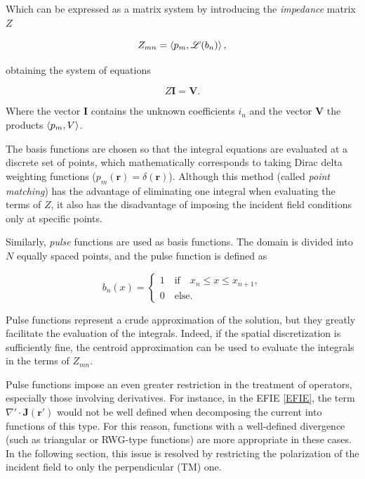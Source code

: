 \documentclass[11pt,a4paper,twoside,pdf]{article}
\numberwithin{equation}{section}
\begin{document}
Which can be expressed as a matrix system by introducing the \textit{impedance} matrix $Z$

$$
    Z_{mn} = \braket{p_m, \mathscr{L}(b_n)},
$$

obtaining the system of equations

\begin{equation}
    Z \mathbf{I} = \mathbf{V}.
\label{ZIV}
\end{equation}

Where the vector $\mathbf{I}$ contains the unknown coefficients $i_n$ and the vector $\mathbf{V}$ the products $\braket{p_m, V}$.

The basis functions are chosen so that the integral equations are evaluated at a discrete set of points, which mathematically corresponds to taking Dirac delta weighting functions ($p_m(\mathbf{r}) = \delta(\mathbf{r})$). Although this method (called \textit{point matching}) has the advantage of eliminating one integral when evaluating the terms of $Z$, it also has the disadvantage of imposing the incident field conditions only at specific points.


Similarly, \textit{pulse} functions are used as basis functions. The domain is divided into $N$ equally spaced points, and the pulse function is defined as

$$
    b_n(x) =
    \begin{cases}
        1 \quad \text{if}  \quad x_n \leq x \leq x_{n+1}, \\
        0  \quad  \text{else}.
    \end{cases}
$$

Pulse functions represent a crude approximation of the solution, but they greatly facilitate the evaluation of the integrals. Indeed, if the spatial discretization is sufficiently fine, the centroid approximation can be used to evaluate the integrals in the terms of $Z_{mn}$.

Pulse functions impose an even greater restriction in the treatment of operators, especially those involving derivatives. For instance, in the EFIE \ref{EFIE}, the term $\nabla' \cdot \mathbf{J(\mathbf{r'})}$ would not be well defined when decomposing the current into functions of this type. For this reason, functions with a well-defined divergence (such as triangular or RWG-type functions) are more appropriate in these cases.
In the following section, this issue is resolved by restricting the polarization of the incident field to only the perpendicular (TM) one.
\end{document}

